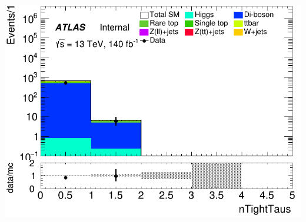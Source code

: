 \documentclass[usenames,dvipsnames]{beamer}
\begin{document}
\begin{frame}
\begin{minipage}{0.32\textwidth}
        \includegraphics[width=\textwidth]{graphics/LLL_met/LLL_met_nTightTaus.png}
    \end{minipage}
\end{frame}
\end{document}
